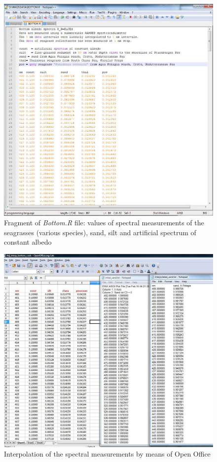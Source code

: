 \documentclass[11pt]{article}
\begin{document}
\begin{appendices}
\begin{figure}[H]
	\centering
	\includegraphics[scale=0.4]{Fig-28.jpg}
	\caption{Fragment of \textit{Bottom.R} file: values of spectral measurements of the
		seagrasses (various species), sand, silt and artificial spectrum of constant albedo}
	\label{fig:A.9}
\end{figure}
\pagebreak

\begin{figure}[H]
	\begin{center}
		\includegraphics[scale=0.35]{Interpolation.jpg}
		\caption{Interpolation of the spectral measurements by means of Open Office}
		\label{fig:A.10}
	\end{center}
\end{figure}
\pagebreak


\end{appendices}
\end{document}
